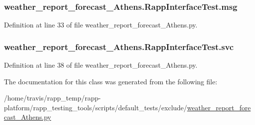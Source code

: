 \hypertarget{classweather__report__forecast__Athens_1_1RappInterfaceTest_a8b66053935a541b6541221079c4d2a4d}{
\subsubsection[{msg}]{\setlength{\rightskip}{0pt plus 5cm}weather\-\_\-report\-\_\-forecast\-\_\-\-Athens.\-Rapp\-Interface\-Test.\-msg}}\label{classweather__report__forecast__Athens_1_1RappInterfaceTest_a8b66053935a541b6541221079c4d2a4d}


Definition at line 33 of file weather\-\_\-report\-\_\-forecast\-\_\-\-Athens.\-py.

\hypertarget{classweather__report__forecast__Athens_1_1RappInterfaceTest_a114263d7eb97783dc77472506436a17d}{
\subsubsection[{svc}]{\setlength{\rightskip}{0pt plus 5cm}weather\-\_\-report\-\_\-forecast\-\_\-\-Athens.\-Rapp\-Interface\-Test.\-svc}}\label{classweather__report__forecast__Athens_1_1RappInterfaceTest_a114263d7eb97783dc77472506436a17d}


Definition at line 38 of file weather\-\_\-report\-\_\-forecast\-\_\-\-Athens.\-py.



The documentation for this class was generated from the following file\-:\begin{DoxyCompactItemize}
\item 
/home/travis/rapp\-\_\-temp/rapp-\/platform/rapp\-\_\-testing\-\_\-tools/scripts/default\-\_\-tests/exclude/\hyperlink{weather__report__forecast__Athens_8py}{weather\-\_\-report\-\_\-forecast\-\_\-\-Athens.\-py}\end{DoxyCompactItemize}
